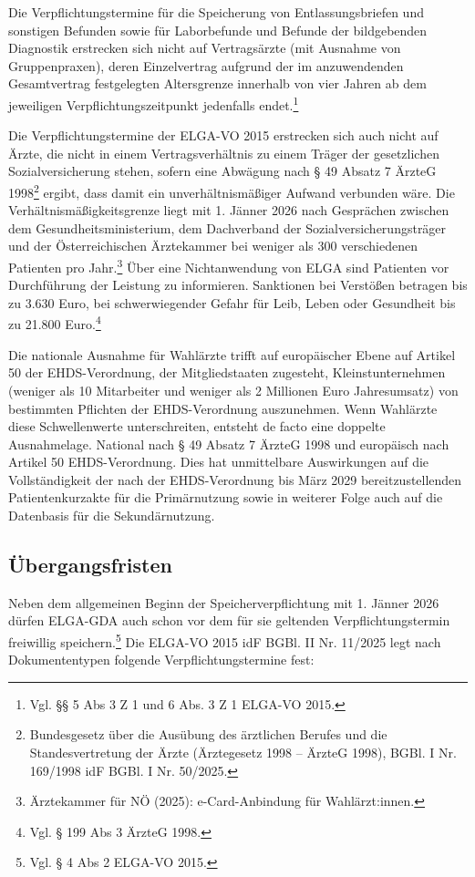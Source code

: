 Die Verpflichtungstermine für die Speicherung von Entlassungsbriefen und sonstigen Befunden sowie für Laborbefunde und Befunde der bildgebenden Diagnostik erstrecken sich nicht auf Vertragsärzte (mit Ausnahme von Gruppenpraxen), deren Einzelvertrag aufgrund der im anzuwendenden Gesamtvertrag festgelegten Altersgrenze innerhalb von vier Jahren ab dem jeweiligen Verpflichtungszeitpunkt jedenfalls endet.\footnote{Vgl. §§ 5 Abs 3 Z 1 und 6 Abs. 3 Z 1 ELGA-VO 2015.}

Die Verpflichtungstermine der ELGA-VO 2015 erstrecken sich auch nicht auf Ärzte, die nicht in einem Vertragsverhältnis zu einem Träger der gesetzlichen Sozialversicherung stehen, sofern eine Abwägung nach § 49 Absatz 7 ÄrzteG 1998\footnote{Bundesgesetz über die Ausübung des ärztlichen Berufes und die Standesvertretung der Ärzte (Ärztegesetz
1998 – ÄrzteG 1998), BGBl. I Nr. 169/1998 idF BGBl. I Nr. 50/2025.
} ergibt, dass damit ein unverhältnismäßiger Aufwand verbunden wäre. Die Verhältnismäßigkeitsgrenze liegt mit 1. Jänner 2026 nach Gesprächen zwischen dem Gesundheitsministerium, dem Dachverband der Sozialversicherungsträger und der Österreichischen Ärztekammer bei weniger als 300 verschiedenen Patienten pro Jahr.\footnote{Ärztekammer für NÖ (2025): e-Card-Anbindung für Wahlärzt:innen.}
Über eine Nichtanwendung von ELGA sind Patienten vor Durchführung der Leistung zu informieren. Sanktionen bei Verstößen betragen bis zu 3.630 Euro, bei schwerwiegender Gefahr für Leib, Leben oder Gesundheit bis zu 21.800 Euro.\footnote{Vgl. § 199 Abs 3 ÄrzteG 1998.}

Die nationale Ausnahme für Wahlärzte trifft auf europäischer Ebene auf Artikel 50 der EHDS-Verordnung, der Mitgliedstaaten zugesteht, Kleinstunternehmen (weniger als 10 Mitarbeiter und weniger als 2 Millionen Euro Jahresumsatz) von bestimmten Pflichten der EHDS-Verordnung auszunehmen. Wenn Wahlärzte diese Schwellenwerte unterschreiten, entsteht de facto eine doppelte Ausnahmelage. National nach § 49 Absatz 7 ÄrzteG 1998 und europäisch nach Artikel 50 EHDS-Verordnung. Dies hat unmittelbare Auswirkungen auf die Vollständigkeit der nach der EHDS-Verordnung bis März 2029 bereitzustellenden Patientenkurzakte für die Primärnutzung sowie in weiterer Folge auch auf die Datenbasis für die Sekundärnutzung.

        \subsection{Übergangsfristen}
Neben dem allgemeinen Beginn der Speicherverpflichtung mit 1. Jänner 2026 dürfen ELGA-GDA auch schon vor dem für sie geltenden Verpflichtungstermin freiwillig speichern.\footnote{Vgl. § 4 Abs 2 ELGA-VO 2015.} Die ELGA-VO 2015 idF BGBl. II Nr. 11/2025 legt nach Dokumententypen folgende Verpflichtungstermine fest:

